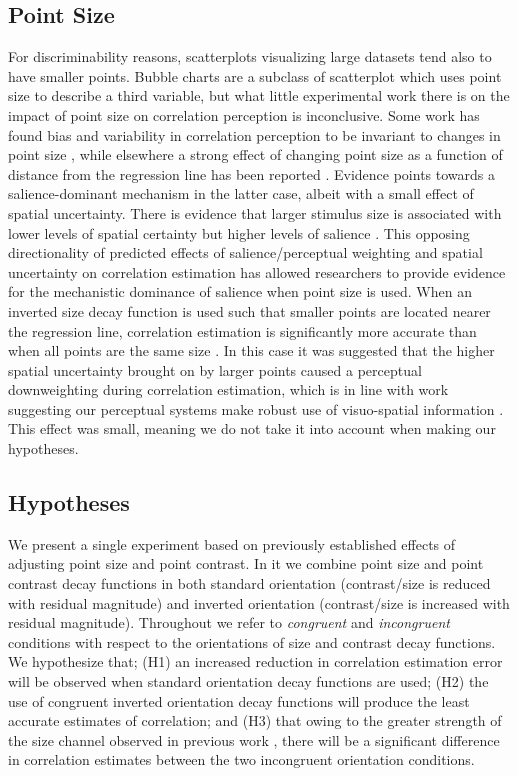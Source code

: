 \documentclass[manuscript, anonymous, screen]{acmart}
\begin{document}
\hypertarget{sec-point-size}{%
\subsection{Point Size}\label{sec-point-size}}

For discriminability reasons, scatterplots visualizing large datasets
tend also to have smaller points. Bubble charts are a subclass of
scatterplot which uses point size to describe a third variable, but what
little experimental work there is on the impact of point size on
correlation perception is inconclusive. Some work has found bias and
variability in correlation perception to be invariant to changes in
point size \citep{rensink_2012, rensink_2014}, while elsewhere a strong
effect of changing point size as a function of distance from the
regression line has been reported \citep{strain_2023b}. Evidence points
towards a salience-dominant mechanism in the latter case, albeit with a
small effect of spatial uncertainty. There is evidence that larger
stimulus size is associated with lower levels of spatial certainty
\citep{alais_2004} but higher levels of salience \citep{healey_2011}.
This opposing directionality of predicted effects of salience/perceptual
weighting and spatial uncertainty on correlation estimation has allowed
researchers to provide evidence for the mechanistic dominance of
salience when point size is used. When an inverted size decay function
is used such that smaller points are located nearer the regression line,
correlation estimation is significantly more accurate than when all
points are the same size \citep{strain_2023b}. In this case it was
suggested that the higher spatial uncertainty brought on by larger
points caused a perceptual downweighting during correlation estimation,
which is in line with work suggesting our perceptual systems make robust
use of visuo-spatial information
\citep{strain_2023b, warren_2002, warren_2004}. This effect was small,
meaning we do not take it into account when making our hypotheses.

\hypertarget{hypotheses}{%
\subsection{Hypotheses}\label{hypotheses}}

We present a single experiment based on previously established effects
of adjusting point size and point contrast. In it we combine point size
and point contrast decay functions in both standard orientation
(contrast/size is reduced with residual magnitude) and inverted
orientation (contrast/size is increased with residual magnitude).
Throughout we refer to \emph{congruent} and \emph{incongruent}
conditions with respect to the orientations of size and contrast decay
functions. We hypothesize that; (H1) an increased reduction in
correlation estimation error will be observed when standard orientation
decay functions are used; (H2) the use of congruent inverted orientation
decay functions will produce the least accurate estimates of
correlation; and (H3) that owing to the greater strength of the size
channel observed in previous work \citep{strain_2023b}, there will be a
significant difference in correlation estimates between the two
incongruent orientation conditions.
\end{document}
